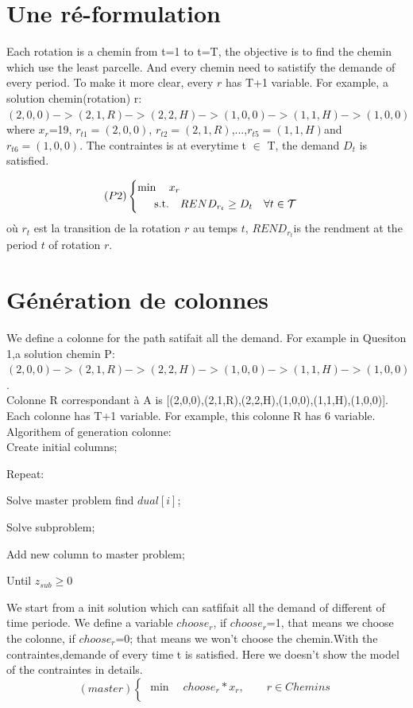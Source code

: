 \documentclass[a4paper]{article}
\begin{document}
\section{Une ré-formulation}
Each rotation is a chemin from t=1 to t=T, the objective is to find the chemin which use the least parcelle. And every chemin need to satistify the demande of every period. To make it more clear, every $r$ has T+1 variable. For example, a solution chemin(rotation) r: $(2,0,0)->(2,1,R)->(2,2,H)->(1,0,0)->(1,1,H)->(1,0,0)$ where $x_r$=19, $r_{t1}=(2,0,0)$,  $r_{t2}=(2,1,R)$,...,$r_{t5}=(1,1,H)$and $r_{t6}=(1,0,0)$. The contraintes is at everytime t $\in $ T, the demand $D_t$ is satisfied.

\begin{equation*}
    (P2) \left\{ 
    \begin{aligned}
    \min\quad   x_{r}   \\
    \text{s.t.\quad} & REND_{r_t} \geq D_{t} & & \forall t\in \mathcal{T}\\
  \end{aligned}
\right.
\end{equation*}
où $r_t$ est la transition de la rotation $r$ au temps $t$, ${REND}_{r_t} $is the rendment at the period $t$ of rotation $r$. 

\section{Génération de colonnes}

We define a colonne for the path satifait all the demand. For example in Quesiton 1,a solution chemin P: $(2,0,0)->(2,1,R)->(2,2,H)->(1,0,0)->(1,1,H)->(1,0,0)$. \\
Colonne R correspondant à A is [(2,0,0),(2,1,R),(2,2,H),(1,0,0),(1,1,H),(1,0,0)]. Each colonne has T+1 variable. For example, this colonne R has 6 variable.
\\

		Algorithem of generation colonne:\\

		Create initial columns;
		
			Repeat:
			
					 Solve master problem find $dual[i]$;
					 
					 Solve subproblem;
					 
					 Add new column to master problem;
					 
	   		 Until $z_{sub} \geq 0$

We start from a init solution which can satfifait all the demand of different of time periode. We define a variable $choose_r$, if $choose_r$=1, that means we choose the colonne, if $choose_r$=0;
that means we won't choose the chemin.With the contraintes,demande of every time t is satisfied. Here we doesn't show the model of the contraintes in details.
\begin{equation*}
    (master) \left\{ 
    \begin{aligned}
    \min\quad   choose_{r}*x_{r} , \qquad r \in Chemins \\
  \end{aligned}
\right.
\end{equation*}
\end{document}
